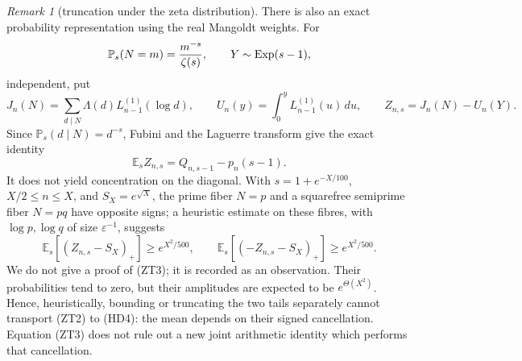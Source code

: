 \documentclass[11pt]{amsart}
\theoremstyle{definition}
\theoremstyle{remark}
\newtheorem{remark}[theorem]{Remark}
\theoremstyle{definition}
\begin{document}
\begin{remark}[truncation under the zeta distribution]
\label{rmk:zeta-law-deep-truncation}
There is also an exact probability representation using the real Mangoldt
weights.  For
\[
 \mathbb P_s(N=m)={m^{-s}\over\zeta(s)},\qquad
 Y\sim{\rm Exp}(s-1),
\]
independent, put
\[
 J_n(N)=\sum_{d\mid N}\Lambda(d)L_{n-1}^{(1)}(\log d),
 \qquad
 U_n(y)=\int_0^yL_{n-1}^{(1)}(u)\,du,
 \qquad Z_{n,s}=J_n(N)-U_n(Y).                           \tag{ZT1}
\]
Since \(\mathbb P_s(d\mid N)=d^{-s}\), Fubini and the Laguerre transform
give the exact identity
\[
 \mathbb E_s Z_{n,s}=Q_{n,s-1}-p_n(s-1).                \tag{ZT2}
\]
It does not yield concentration on the diagonal.  With
\(s=1+e^{-X/100}\), \(X/2\le n\le X\), and \(S_X=e^{\sqrt X}\), the
prime fiber \(N=p\) and a squarefree semiprime fiber \(N=pq\) have
opposite signs; a heuristic estimate on these fibres, with $\log p,\log q$
of size $\varepsilon^{-1}$, suggests
\[
 \mathbb E_s[(Z_{n,s}-S_X)_+]\ge e^{X^2/500},\qquad
 \mathbb E_s[(-Z_{n,s}-S_X)_+]\ge e^{X^2/500}.          \tag{ZT3}
\]
We do not give a proof of (ZT3); it is recorded as an observation.
Their probabilities tend to zero, but their amplitudes are expected to be
\(e^{\Theta(X^2)}\).  Hence, heuristically, bounding or truncating the two tails
separately cannot transport (ZT2) to (HD4): the mean depends on their
signed cancellation.  Equation (ZT3) does not rule out a new joint
arithmetic identity which performs that cancellation.
\end{remark}
\end{document}
